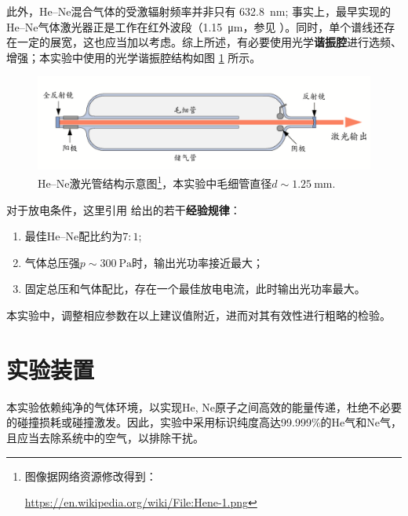\documentclass[aps,pre,12pt,preprint,%
	onecolumn,showpacs,showkeys,nofootinbib]{revtex4-1}
\begin{document}
	此外，He--Ne混合气体的受激辐射频率并非只有 \SI{632.8}{\nm}; 事实上，最早实现的He--Ne气体激光器正是工作在红外波段（\SI{1.15}{\um}，参见 \cite{javan1961population}）。同时，单个谱线还存在一定的展宽，这也应当加以考虑。综上所述，有必要使用光学\textbf{谐振腔}进行选频、增强；本实验中使用的光学谐振腔结构如图 \ref{fig:gasTube} 所示。
	\begin{figure}[!h]
	\centering
	\vspace{-.5\baselineskip}
	\includegraphics[width=.9\linewidth]{gasTube.png}
	\caption[\textup{He--Ne}激光管结构]{%
		\textup{He--Ne}激光管结构示意图\footnote{%
			图像据网络资源修改得到：\par
			\noindent%
			\url{https://en.wikipedia.org/wiki/File:Hene-1.png}%
		}，本实验中毛细管直径$d\sim\SI{1.25}{\mm}$. \vspace{1ex}
	}
	\label{fig:gasTube}
	\end{figure}
\FloatBarrier
	
	对于放电条件，这里引用 \cite{textbook} 给出的若干\textbf{经验规律}：
	\begin{enumerate}[noitemsep]
	\item 最佳He--Ne配比约为$7:1$; 
	\item 气体总压强$p\sim\SI{300}{\Pa}$时，输出光功率接近最大；
	\item 固定总压和气体配比，存在一个最佳放电电流，此时输出光功率最大。
	\end{enumerate}
	本实验中，调整相应参数在以上建议值附近，进而对其有效性进行粗略的检验。
\section{实验装置}
	本实验依赖纯净的气体环境，以实现He, Ne原子之间高效的能量传递，杜绝不必要的碰撞损耗或碰撞激发。因此，实验中采用标识纯度高达99.999\%的He气和Ne气，且应当去除系统中的空气，以排除干扰。
	
\end{document}
